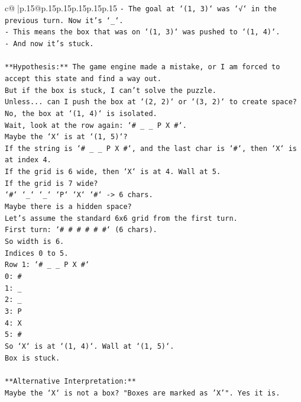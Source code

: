 \documentclass{article}
\begin{document}
{\begin{supertabular}{c@{$\;$}|p{.15\linewidth}@{}p{.15\linewidth}p{.15\linewidth}p{.15\linewidth}p{.15\linewidth}p{.15\linewidth}}
{{{\texttt{{-} The goal at `(1, 3)` was `√` in the previous turn. Now it's `\_`.} \\
\texttt{{-} This means the box that was on `(1, 3)` was pushed to `(1, 4)`.} \\
\texttt{{-} And now it's stuck.} \\
\\ 
\texttt{**Hypothesis:** The game engine made a mistake, or I am forced to accept this state and find a way out.} \\
\texttt{But if the box is stuck, I can't solve the puzzle.} \\
\texttt{Unless... can I push the box at `(2, 2)` or `(3, 2)` to create space?} \\
\texttt{No, the box at `(1, 4)` is isolated.} \\
\texttt{Wait, look at the row again: `\# \_ \_ P X \#`.} \\
\texttt{Maybe the `X` is at `(1, 5)`?} \\
\texttt{If the string is `\# \_ \_ P X \#`, and the last char is `\#`, then `X` is at index 4.} \\
\texttt{If the grid is 6 wide, then `X` is at 4. Wall at 5.} \\
\texttt{If the grid is 7 wide?} \\
\texttt{`\#` `\_` `\_` `P` `X` `\#` {-}> 6 chars.} \\
\texttt{Maybe there is a hidden space?} \\
\texttt{Let's assume the standard 6x6 grid from the first turn.} \\
\texttt{First turn: `\# \# \# \# \# \#` (6 chars).} \\
\texttt{So width is 6.} \\
\texttt{Indices 0 to 5.} \\
\texttt{Row 1: `\# \_ \_ P X \#`} \\
\texttt{0: \#} \\
\texttt{1: \_} \\
\texttt{2: \_} \\
\texttt{3: P} \\
\texttt{4: X} \\
\texttt{5: \#} \\
\texttt{So `X` is at `(1, 4)`. Wall at `(1, 5)`.} \\
\texttt{Box is stuck.} \\
\\ 
\texttt{**Alternative Interpretation:**} \\
\texttt{Maybe the `X` is not a box? "Boxes are marked as 'X'". Yes it is.} \\
}}}
\end{supertabular}}
\end{document}
